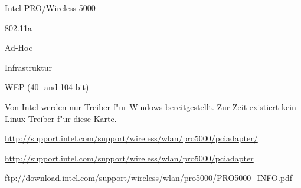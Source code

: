 %
%

\begin{wlandevice}{Intel PRO/Wireless 5000}



\begin{wlanieeestandard}
\item 802.11a
\end{wlanieeestandard}

\begin{wlanmode}
\item Ad-Hoc
\item Infrastruktur
\end{wlanmode}

\begin{wlansecurity}
\item WEP (40- and 104-bit)
\end{wlansecurity}

\begin{wlandriver}
\item
Von Intel werden nur Treiber f"ur Windows bereitgestellt. Zur Zeit existiert
kein Linux-Treiber f"ur diese Karte.
\end{wlandriver}


\begin{wlaninstall}
\item \url{http://support.intel.com/support/wireless/wlan/pro5000/pciadapter/}
\end{wlaninstall}

\begin{wlanlink}
\item \url{http://support.intel.com/support/wireless/wlan/pro5000/pciadapter}
\item \url{ftp://download.intel.com/support/wireless/wlan/pro5000/PRO5000_INFO.pdf}
\end{wlanlink}

\end{wlandevice}
